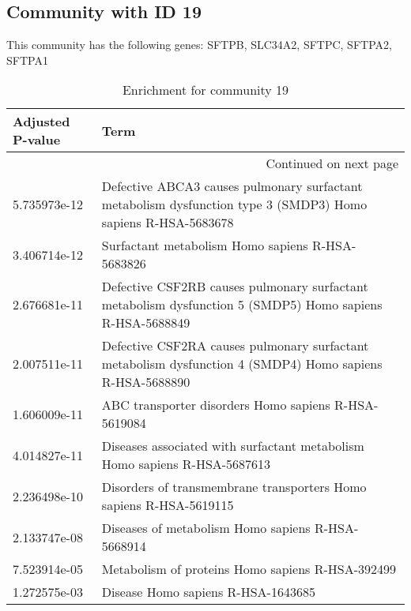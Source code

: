 \subsection*{Community with ID 19}
This community has the following genes: SFTPB, SLC34A2, SFTPC, SFTPA2, SFTPA1
\\
\begin{longtable}{p{2.4cm}p{14.5cm}}
\caption{Enrichment for community 19}\\
\toprule
Adjusted \newline P-value &                                                                                                          Term \\
\midrule
\endhead
\midrule
\multicolumn{2}{r}{{Continued on next page}} \\
\midrule
\endfoot

\bottomrule
\endlastfoot
             5.735973e-12 &  Defective ABCA3 causes pulmonary surfactant metabolism dysfunction type 3 (SMDP3) Homo sapiens R-HSA-5683678 \\
             3.406714e-12 &                                                              Surfactant metabolism Homo sapiens R-HSA-5683826 \\
             2.676681e-11 &      Defective CSF2RB causes pulmonary surfactant metabolism dysfunction 5 (SMDP5) Homo sapiens R-HSA-5688849 \\
             2.007511e-11 &      Defective CSF2RA causes pulmonary surfactant metabolism dysfunction 4 (SMDP4) Homo sapiens R-HSA-5688890 \\
             1.606009e-11 &                                                          ABC transporter disorders Homo sapiens R-HSA-5619084 \\
             4.014827e-11 &                                     Diseases associated with surfactant metabolism Homo sapiens R-HSA-5687613 \\
             2.236498e-10 &                                            Disorders of transmembrane transporters Homo sapiens R-HSA-5619115 \\
             2.133747e-08 &                                                             Diseases of metabolism Homo sapiens R-HSA-5668914 \\
             7.523914e-05 &                                                              Metabolism of proteins Homo sapiens R-HSA-392499 \\
             1.272575e-03 &                                                                            Disease Homo sapiens R-HSA-1643685 \\
\end{longtable}


